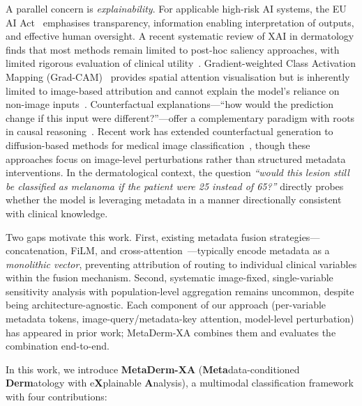 \documentclass[12pt, a4paper]{article}
\begin{document}
A parallel concern is \emph{explainability}. For applicable high-risk AI systems, the EU AI Act~\citep{eu2024aiact} emphasises transparency, information enabling interpretation of outputs, and effective human oversight. A recent systematic review of XAI in dermatology finds that most methods remain limited to post-hoc saliency approaches, with limited rigorous evaluation of clinical utility~\citep{hauser2022skin}. Gradient-weighted Class Activation Mapping (Grad-CAM)~\citep{selvaraju2017grad} provides spatial attention visualisation but is inherently limited to image-based attribution and cannot explain the model's reliance on non-image inputs~\citep{nunnari2021xai}. Counterfactual explanations---``how would the prediction change if this input were different?''---offer a complementary paradigm with roots in causal reasoning~\citep{pearl2009causality, mothilal2020dice}. Recent work has extended counterfactual generation to diffusion-based methods for medical image classification~\citep{atad2024counterfactual}, though these approaches focus on image-level perturbations rather than structured metadata interventions. In the dermatological context, the question \emph{``would this lesion still be classified as melanoma if the patient were 25 instead of 65?''} directly probes whether the model is leveraging metadata in a manner directionally consistent with clinical knowledge.

Two gaps motivate this work. First, existing metadata fusion strategies---concatenation, FiLM, and cross-attention~\citep{erdem2026crossmeta, tranvan2025multimodal}---typically encode metadata as a \emph{monolithic vector}, preventing attribution of routing to individual clinical variables within the fusion mechanism. Second, systematic image-fixed, single-variable sensitivity analysis with population-level aggregation remains uncommon, despite being architecture-agnostic. Each component of our approach (per-variable metadata tokens, image-query/metadata-key attention, model-level perturbation) has appeared in prior work; MetaDerm-XA combines them and evaluates the combination end-to-end.

In this work, we introduce \textbf{MetaDerm-XA} (\textbf{Meta}data-conditioned \textbf{Derm}atology with e\textbf{X}plainable \textbf{A}nalysis), a multimodal classification framework with four contributions:
\end{document}
